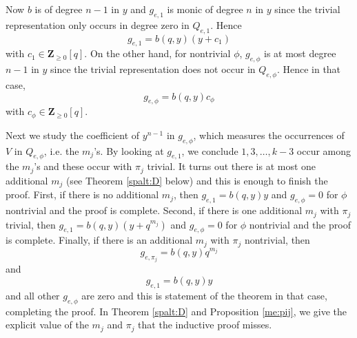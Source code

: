 \documentclass[10pt]{amsart}
\newcommand{\zz}{\mathbf Z}
\newcommand{\flag}{{\mathcal B}}
\theoremstyle{plain}
\theoremstyle{definition}
\theoremstyle{remark}
\begin{document}
Now $b$ is of degree $n-1$ in $y$ and $g_{e, 1}$ is monic of degree $n$ in $y$ 
since the trivial representation only occurs in degree zero in $Q_{e,1}$.
Hence 
$$g_{e, 1} = b(q,y)(y + c_1)$$  with $c_1 \in \zz_{\geq 0}[q]$. 
On the other hand, for nontrivial $\phi$, $g_{e, \phi}$ is at most degree $n-1$ in $y$ since the trivial representation
does not occur in $Q_{e, \phi}$.  Hence in that case,
$$g_{e, \phi} = b(q,y)c_{\phi}$$  with $c_{\phi} \in \zz_{\geq 0}[q]$. 

Next we study the coefficient of $y^{n-1}$ in $g_{e,\phi}$, which measures the occurrences of $V$ in 
$Q_{e, \phi}$, 
i.e.\! the $m_j$'s.
By looking at $g_{e, 1}$, we conclude $1, 3, \dots, k-3$ occur among the $m_j$'s and these occur with $\pi_j$ trivial.
It turns out there is at most one additional $m_j$ (see Theorem \ref{spalt:D} below) and this is enough to finish the proof.  
First, if there is no additional $m_j$, then $g_{e,1} = b(q,y)y$ and $g_{e,\phi}=0$ for $\phi$ nontrivial and the proof is complete.
Second, if there is one additional $m_j$ with $\pi_j$ trivial, then 
$g_{e,1} = b(q,y)(y+q^{m_j})$ and $g_{e,\phi}=0$ for $\phi$ nontrivial and the proof is complete.
Finally, if there is an additional $m_j$ with $\pi_j$ nontrivial, then 
$$g_{e,\pi_j} = b(q,y)q^{m_j}$$ and 
$$g_{e,1} = b(q,y)y$$ and all other $g_{e, \phi}$ are zero and this is statement of the theorem in that case, completing the proof.
In Theorem \ref{spalt:D} and Proposition \ref{me:pij}, we give the explicit value of the $m_j$ and $\pi_j$ that the inductive proof misses.


%
\end{document}
